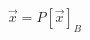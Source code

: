 \documentclass[preview]{standalone}
\begin{document}
\begin{align*}
\vec{x} = P [\vec{x}]_B
\end{align*}
\end{document}
